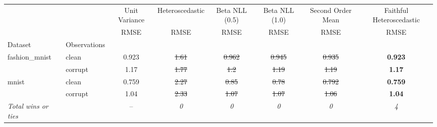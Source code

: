\begin{tabular}{ll|c|c|c|c|c|c}
\toprule
{} & {} & {Unit Variance} & {Heteroscedastic} & {Beta NLL (0.5)} & {Beta NLL (1.0)} & {Second Order Mean} & {Faithful Heteroscedastic} \\
{} & {} & {RMSE} & {RMSE} & {RMSE} & {RMSE} & {RMSE} & {RMSE} \\
{Dataset} & {Observations} & {} & {} & {} & {} & {} & {} \\
\midrule
\multirow[t]{2}{*}{fashion_mnist} & clean & 0.923 & \sout{1.61} & \sout{0.962} & \sout{0.945} & \sout{0.935} & \textbf{0.923} \\
 & corrupt & 1.17 & \sout{1.77} & \sout{1.2} & \sout{1.19} & \sout{1.19} & \textbf{1.17} \\
\multirow[t]{2}{*}{mnist} & clean & 0.759 & \sout{2.27} & \sout{0.85} & \sout{0.78} & \sout{0.792} & \textbf{0.759} \\
 & corrupt & 1.04 & \sout{2.33} & \sout{1.07} & \sout{1.07} & \sout{1.06} & \textbf{1.04} \\
\textit{{Total wins or ties}} &  & -- & \textit{0} & \textit{0} & \textit{0} & \textit{0} & \textit{4} \\
\bottomrule
\end{tabular}
